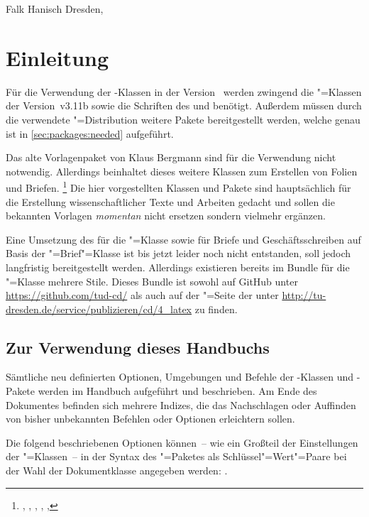 \documentclass[%
  english,ngerman,%
  headings=optiontoheadandtoc,captions=tableheading,numbers=noenddot,%
  chapterpage,cdfoot,%
]{tudscrman}
\newcommand*\vKOMA{v3.11b}
\begin{document}
\makeatletter
\bigskip
\noindent Falk Hanisch\newline
Dresden, \@@date
\makeatother

\tableofcontents



\chapter{Einleitung}
Für die Verwendung der \TUDScript-Klassen in der Version~\vTUDScript{} werden 
zwingend die \KOMAScript"=Klassen der Version~\vKOMA{} sowie die Schriften des 
\CDs \Univers und \DIN benötigt. Außerdem müssen durch die verwendete 
"=Distribution weitere Pakete bereitgestellt werden, welche genau 
ist in \autoref{sec:packages:needed} aufgeführt.

Das alte Vorlagenpaket von Klaus Bergmann sind für die Verwendung nicht 
notwendig. Allerdings beinhaltet dieses weitere Klassen zum Erstellen von Folien 
und Briefen.%
\footnote{%
  , , , , 
  , 
}
Die hier vorgestellten Klassen und Pakete sind hauptsächlich für die 
Erstellung wissenschaftlicher Texte und Arbeiten gedacht und sollen die 
bekannten Vorlagen \emph{momentan} nicht ersetzen sondern vielmehr ergänzen. 

Eine Umsetzung des \CDs für die "=Klasse sowie für Briefe und 
Geschäftsschreiben auf Basis der \KOMAScript"=Brief"=Klasse  
ist bis jetzt leider noch nicht entstanden, soll jedoch langfristig 
bereitgestellt werden. Allerdings existieren bereits im Bundle 
 für die "=Klasse mehrere Stile. Dieses 
Bundle ist sowohl auf \mbox{GitHub} unter \url{https://github.com/tud-cd/} als 
auch auf der "=Seite der \TnUD unter
\url{http://tu-dresden.de/service/publizieren/cd/4_latex} zu finden.


\section{Zur Verwendung dieses Handbuchs}
Sämtliche neu definierten Optionen, Umgebungen und Befehle der 
\TUDScript-Klassen und \TUDScript-Pakete werden im Handbuch aufgeführt und 
beschrieben. Am Ende des Dokumentes befinden sich mehrere Indizes, die das 
Nachschlagen oder Auffinden von bisher unbekannten Befehlen oder Optionen 
erleichtern sollen.

Die folgend beschriebenen Optionen können~-- wie ein Großteil der Einstellungen 
der \KOMAScript"=Klassen~-- in der Syntax des "=Paketes als 
Schlüssel"=Wert"=Paare bei der Wahl der Dokumentklasse angegeben werden:
%
.
\end{document}
